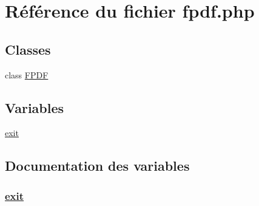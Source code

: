 \hypertarget{fpdf_8php}{
\section{R\'{e}f\'{e}rence du fichier fpdf.php}
\label{fpdf_8php}
}
\subsection*{Classes}
\begin{CompactItemize}
\item 
class \hyperlink{classFPDF}{FPDF}
\end{CompactItemize}
\subsection*{Variables}
\begin{CompactItemize}
\item 
\hyperlink{fpdf_8php_a0}{exit}
\end{CompactItemize}


\subsection{Documentation des variables}
\hypertarget{fpdf_8php_a0}{
\subsubsection[exit]{\setlength{\rightskip}{0pt plus 5cm}\hyperlink{pdf_2fpdf_8php_a0}{exit}}}
\label{fpdf_8php_a0}


